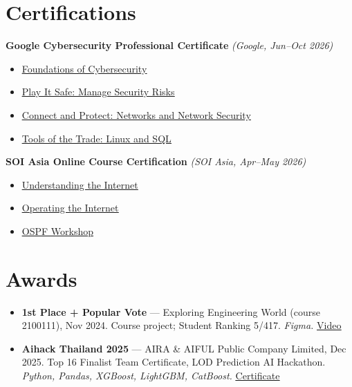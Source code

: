 \documentclass[11pt,a4paper]{article}
\let\oldhref\href
\renewcommand{\href}[2]{\oldhref{#1}{\uline{#2}}}
\begin{document}
\section{Certifications}
\textbf{Google Cybersecurity Professional Certificate} \textit{(Google, Jun--Oct 2026)}
\begin{itemize}
  \item \href{https://coursera.org/share/b0f2c74e9855b8b517aa0073db831c4a}{Foundations of Cybersecurity}
  \item \href{https://coursera.org/share/d76fb8febca841139ed27602e77db71c}{Play It Safe: Manage Security Risks}
  \item \href{https://coursera.org/share/6ecd4fd75d075eecc37a9bd0199171f2}{Connect and Protect: Networks and Network Security}
  \item \href{https://coursera.org/share/aa1f1ea9846e08487e8c758c2370e6b5}{Tools of the Trade: Linux and SQL}
\end{itemize}
\textbf{SOI Asia Online Course Certification} \textit{(SOI Asia, Apr--May 2026)}
\begin{itemize}
  \item \href{https://inxignia.soi.asia/public/assertions/2VMt742kQke1HmAH4-fbhQ}{Understanding the Internet}
  \item \href{https://inxignia.soi.asia/public/assertions/AUzKTp_TQI66ztAQiz-1eg}{Operating the Internet}
  \item \href{https://inxignia.soi.asia/public/assertions/TGMEbmWSQEC67p5CBaKkMg}{OSPF Workshop}
\end{itemize}

\section{Awards}
\begin{itemize}
  \item \textbf{1st Place + Popular Vote} --- Exploring Engineering World (course 2100111), Nov 2024. Course project; Student Ranking 5/417. \textit{Figma.} \href{https://youtu.be/MJtl5JIUM9o}{Video}
  \item \textbf{Aihack Thailand 2025} --- AIRA \& AIFUL Public Company Limited, Dec 2025. Top 16 Finalist Team Certificate, LOD Prediction AI Hackathon. \textit{Python, Pandas, XGBoost, LightGBM, CatBoost.} \href{https://drive.google.com/file/d/1unlrGHaMatQl26h353zUoxBGKAdH9IrM/view}{Certificate}
\end{itemize}
\end{document}
